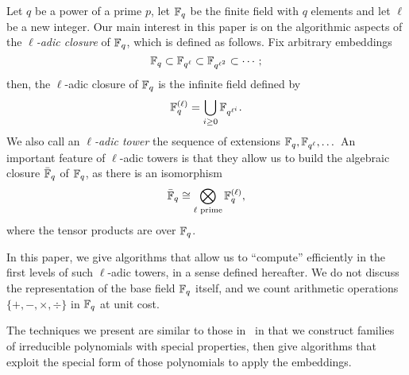 \documentclass{sig-alternate}
\begin{document}

Let $q$ be a power of a prime $p$, let $\mathbb{F}_q$ be the finite field with
$q$ elements and let $\ell$ be a new integer. Our main interest in
this paper is on the algorithmic aspects of the \emph{$\ell$-adic
  closure} of $\mathbb{F}_q$, which is defined as follows. Fix arbitrary
embeddings
\begin{equation*}
  \mathbb{F}_q \subset \mathbb{F}_{q^\ell} \subset \mathbb{F}_{q^{\ell^2}} \subset \cdots;
\end{equation*}
then, the $\ell$-adic closure of $\mathbb{F}_q$ is the infinite field defined by
\begin{equation*}
  \mathbb{F}_q^{(\ell)} = \bigcup_{i\ge 0}\mathbb{F}_{q^{\ell^i}}.
\end{equation*}
We also call an \emph{$\ell$-adic tower} the sequence of extensions
$\mathbb{F}_q,\mathbb{F}_{q^\ell},\dots$ An important feature of $\ell$-adic towers is
that they allow us to build the algebraic closure $\bar{\mathbb{F}}_q$ of
$\mathbb{F}_q$, as there is an isomorphism
\begin{equation*}
  \label{eq:tensor}
  \bar{\mathbb{F}}_q \cong \bigotimes_{\ell\text{ prime}} \mathbb{F}_q^{(\ell)},
\end{equation*}
where the tensor products are over $\mathbb{F}_q$.

In this paper, we give algorithms that allow us to ``compute''
efficiently in the first levels of such $\ell$-adic towers, in a sense
defined hereafter.  We do not discuss the representation of the base
field $\mathbb{F}_q$ itself, and we count arithmetic operations
$\{+,-,\times,\div\}$ in $\mathbb{F}_q$ at unit cost. 


The techniques we present are similar to those in~\cite{df+schost12}
in that we construct families of irreducible polynomials with special
properties, then give algorithms that exploit the special form of
those polynomials to apply the embeddings.
\end{document}
